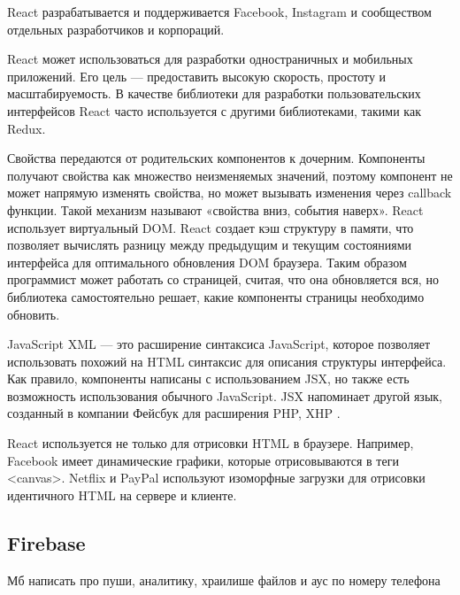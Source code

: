 React разрабатывается и поддерживается Facebook, Instagram и сообществом отдельных разработчиков и корпораций.

React может использоваться для разработки одностраничных и мобильных приложений. Его цель — предоставить высокую скорость, простоту и масштабируемость.
В качестве библиотеки для разработки пользовательских интерфейсов React часто используется с другими библиотеками, такими как Redux.

Свойства передаются от родительских компонентов к дочерним.
Компоненты получают свойства как множество неизменяемых значений, поэтому компонент не может напрямую изменять свойства, но может вызывать изменения через callback функции.
Такой механизм называют «свойства вниз, события наверх».
React использует виртуальный DOM. React создает кэш структуру в памяти, что позволяет вычислять разницу между предыдущим и текущим состояниями интерфейса для оптимального обновления DOM браузера.
Таким образом программист может работать со страницей, считая, что она обновляется вся, но библиотека самостоятельно решает, какие компоненты страницы необходимо обновить.

JavaScript XML — это расширение синтаксиса JavaScript, которое позволяет использовать похожий на HTML синтаксис для описания структуры интерфейса.
Как правило, компоненты написаны с использованием JSX, но также есть возможность использования обычного JavaScript.
JSX напоминает другой язык, созданный в компании Фейсбук для расширения PHP, XHP .

React используется не только для отрисовки HTML в браузере.
Например, Facebook имеет динамические графики, которые отрисовываются в теги <canvas>.
Netflix и PayPal используют изоморфные загрузки для отрисовки идентичного HTML на сервере и клиенте.

\subsection{Firebase}
Мб написать про пуши, аналитику, храилише файлов и аус по номеру телефона
